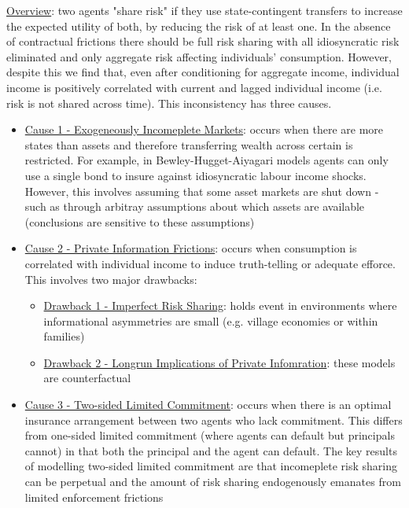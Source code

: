 \documentclass{article}
\begin{document}
\vspace{2.5mm}
\par \underline{Overview}: two agents "share risk" if they use state-contingent transfers to increase the expected utility of both, by reducing the risk of at least one. In the absence of contractual frictions there should be full risk sharing with all idiosyncratic risk eliminated and only aggregate risk affecting individuals' consumption. However, despite this we find that, even after conditioning for aggregate income, individual income is positively correlated with current and lagged individual income (i.e. risk is not shared across time). This inconsistency has three causes.
\begin{itemize}
    \item  \underline{Cause 1 - Exogeneously Incomeplete Markets}: occurs when there are more states than assets and therefore transferring wealth across certain is restricted. For example, in Bewley-Hugget-Aiyagari models agents can only use a single bond to insure against idiosyncratic labour income shocks. However, this involves assuming that some asset markets are shut down - such as through arbitray assumptions about which assets are available (conclusions are sensitive to these assumptions)
    \item  \underline{Cause 2 - Private Information Frictions}: occurs when consumption is correlated with individual income to induce truth-telling or adequate efforce. This involves two major drawbacks:
    \begin{itemize}
        \item  \underline{Drawback 1 - Imperfect Risk Sharing}: holds event in environments where informational asymmetries are small (e.g. village economies or within families)
        \item  \underline{Drawback 2 - Longrun Implications of Private Infomration}: these models are counterfactual
    \end{itemize}
    \item  \underline{Cause 3 - Two-sided Limited Commitment}: occurs when there is an optimal insurance arrangement between two agents who lack commitment. This differs from one-sided limited commitment (where agents can default but principals cannot) in that both the principal and the agent can default. The key results of modelling two-sided limited commitment are that incomeplete risk sharing can be perpetual and the amount of risk sharing endogenously emanates from limited enforcement frictions
\end{itemize}
\end{document}
